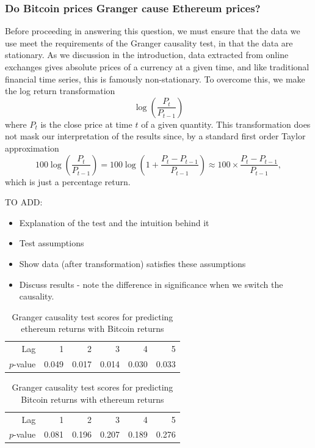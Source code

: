 \documentclass[twoside]{report}
\begin{document}
\begin{spacing}{1}
\subsubsection{Do Bitcoin prices Granger cause Ethereum prices?}
Before proceeding in answering this question, we must ensure that the data we use meet the requirements of the Granger causality test, in that the data are stationary. As we discussion in the introduction, data extracted from online exchanges gives absolute prices of a currency at a given time, and like traditional financial time series, this is famously non-stationary. To overcome this, we make the log return transformation \[
\log\left(\frac{P_t}{P_{t-1}}\right) 
\]
where $P_t$ is the close price at time $t$ of a given quantity. This transformation does not mask our interpretation of the results since, by a standard first order Taylor approximation \[
100\log\left(\frac{P_t}{P_{t-1}}\right) = 100\log\left(1 + \frac{P_t - P_{t-1}}{P_{t-1}}\right) \approx 100 \times \frac{P_t - P_{t-1}}{P_{t-1}},
\]
which is just a percentage return. 



{\color{red}TO ADD:
\begin{itemize}
    \item Explanation of the test and the intuition behind it
    \item Test assumptions
    \item Show data (after transformation) satisfies these assumptions
    \item Discuss results - note the difference in significance when we switch the causality. 
\end{itemize}
}
\begin{table}[ht]
\centering
\begin{tabular}{rrrrrr}
  \hline
 Lag & 1 & 2 & 3 & 4 & 5 \\ 
  $p$-value & 0.049 & 0.017 & 0.014 & 0.030 & 0.033 \\ 
   \hline
\end{tabular}
\caption{Granger causality test scores for predicting ethereum returns with Bitcoin returns} \label{tab:btc_cause_eth}
\end{table}

\begin{table}[ht]
\centering
\begin{tabular}{rrrrrr}
  \hline
 Lag & 1 & 2 & 3 & 4 & 5 \\ 
  $p$-value & 0.081 & 0.196 & 0.207 & 0.189 & 0.276 \\ 
   \hline
\end{tabular}
\caption{Granger causality test scores for predicting Bitcoin returns with ethereum returns} \label{tab:eth_cause_btc}
\end{table}


\end{spacing}
\end{document}
